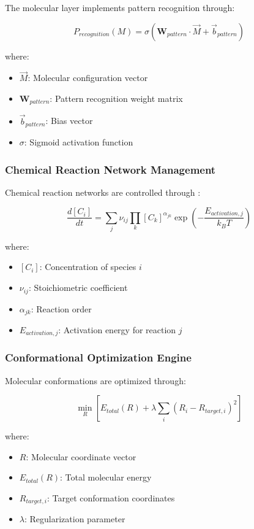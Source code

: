 The molecular layer implements pattern recognition through:

\begin{equation}
P_{recognition}(M) = \sigma\left(\mathbf{W}_{pattern} \cdot \vec{M} + \vec{b}_{pattern}\right)
\end{equation}

where:
\begin{itemize}
\item $\vec{M}$: Molecular configuration vector
\item $\mathbf{W}_{pattern}$: Pattern recognition weight matrix
\item $\vec{b}_{pattern}$: Bias vector
\item $\sigma$: Sigmoid activation function
\end{itemize}

\subsubsection{Chemical Reaction Network Management}

Chemical reaction networks are controlled through \cite{erdi2005mathematical}:

\begin{equation}
\frac{d[C_i]}{dt} = \sum_j \nu_{ij} \prod_k [C_k]^{\alpha_{jk}} \exp\left(-\frac{E_{activation,j}}{k_B T}\right)
\end{equation}

where:
\begin{itemize}
\item $[C_i]$: Concentration of species $i$
\item $\nu_{ij}$: Stoichiometric coefficient
\item $\alpha_{jk}$: Reaction order
\item $E_{activation,j}$: Activation energy for reaction $j$
\end{itemize}

\subsubsection{Conformational Optimization Engine}

Molecular conformations are optimized through:

\begin{equation}
\min_{R} \left[ E_{total}(R) + \lambda \sum_i (R_i - R_{target,i})^2 \right]
\end{equation}

where:
\begin{itemize}
\item $R$: Molecular coordinate vector
\item $E_{total}(R)$: Total molecular energy
\item $R_{target,i}$: Target conformation coordinates
\item $\lambda$: Regularization parameter
\end{itemize}

